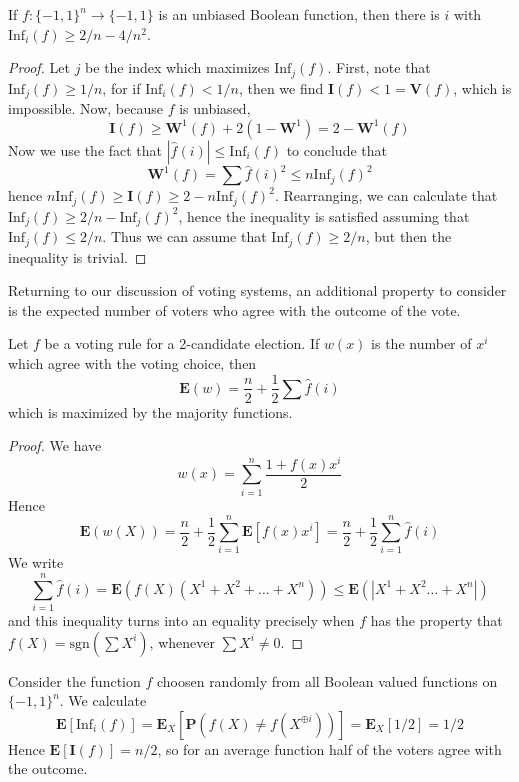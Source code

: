 \begin{lemma}
    If $f: \{ -1, 1 \}^n \to \{ -1, 1 \}$ is an unbiased Boolean function, then there is $i$ with $\text{Inf}_i(f) \geq 2/n - 4/n^2$.
\end{lemma}
\begin{proof}
    Let $j$ be the index which maximizes $\text{Inf}_j(f)$. First, note that $\text{Inf}_j(f) \geq 1/n$, for if $\text{Inf}_i(f) < 1/n$, then we find $\mathbf{I}(f) < 1 = \mathbf{V}(f)$, which is impossible. Now, because $f$ is unbiased,
    \[ \mathbf{I}(f) \geq \mathbf{W}^1(f) + 2(1 - \mathbf{W}^1) = 2 - \mathbf{W}^1(f) \]
    Now we use the fact that $|\widehat{f}(i)| \leq \text{Inf}_i(f)$ to conclude that
    \[ \mathbf{W}^1(f) = \sum \widehat{f}(i)^2 \leq n \text{Inf}_j(f)^2 \]
    hence $n \text{Inf}_j(f) \geq \mathbf{I}(f) \geq 2 - n \text{Inf}_j(f)^2$. Rearranging, we can calculate that $\text{Inf}_j(f) \geq 2/n - \text{Inf}_j(f)^2$, hence the inequality is satisfied assuming that $\text{Inf}_j(f) \leq 2/n$. Thus we can assume that $\text{Inf}_j(f) \geq 2/n$, but then the inequality is trivial.
\end{proof}

Returning to our discussion of voting systems, an additional property to consider is the expected number of voters who agree with the outcome of the vote.

\begin{theorem}
    Let $f$ be a voting rule for a 2-candidate election. If $w(x)$ is the number of $x^i$ which agree with the voting choice, then
    \[ \mathbf{E}(w) = \frac{n}{2} + \frac{1}{2} \sum \widehat{f}(i) \]
    which is maximized by the majority functions.
\end{theorem}
\begin{proof}
    We have
    \[ w(x) = \sum_{i = 1}^n \frac{1 + f(x) x^i}{2} \]
    Hence
    \[ \mathbf{E}(w(X)) = \frac{n}{2} + \frac{1}{2} \sum_{i = 1}^n \mathbf{E}[f(x)x^i] = \frac{n}{2} + \frac{1}{2} \sum_{i = 1}^n \widehat{f}(i) \]
    We write
    \[ \sum_{i = 1}^n \widehat{f}(i) = \mathbf{E}(f(X)(X^1 + X^2 + \dots + X^n)) \leq \mathbf{E}(|X^1 + X^2 \dots + X^n|) \]
    and this inequality turns into an equality precisely when $f$ has the property that $f(X) = \text{sgn}(\sum X^i)$, whenever $\sum X^i \neq 0$.
\end{proof}

\begin{example}
    Consider the function $f$ choosen randomly from all Boolean valued functions on $\{ -1, 1 \}^n$. We calculate
    \[ \mathbf{E}[\text{Inf}_i(f)] = \mathbf{E}_X[\mathbf{P}(f(X) \neq f(X^{\oplus i}))] = \mathbf{E}_X[1/2] = 1/2 \]
    Hence $\mathbf{E}[\mathbf{I}(f)] = n/2$, so for an average function half of the voters agree with the outcome.
\end{example}


